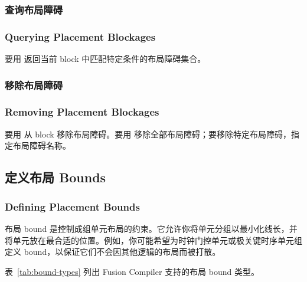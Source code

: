 \subsubsection{查询布局障碍}
\subsubsection*{Querying Placement Blockages}

要用  返回当前 block 中匹配特定条件的布局障碍集合。

\subsubsection{移除布局障碍}
\subsubsection*{Removing Placement Blockages}

要用  从 block 移除布局障碍。要用  移除全部布局障碍；要移除特定布局障碍，指定布局障碍名称。

\subsection{定义布局 Bounds}
\subsubsection*{Defining Placement Bounds}

布局 bound 是控制成组单元布局的约束。它允许你将单元分组以最小化线长，并将单元放在最合适的位置。例如，你可能希望为时钟门控单元或极关键时序单元组定义 bound，以保证它们不会因其他逻辑的布局而被打散。

表~\ref{tab:bound-types} 列出 Fusion Compiler 支持的布局 bound 类型。


